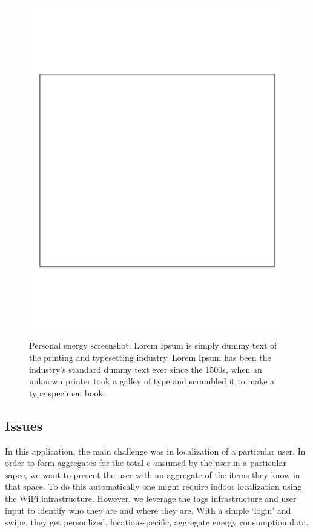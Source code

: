 \begin{figure}[htb!]
\begin{center}
\includegraphics[scale=0.39]{figs/blankbox}
\caption{Personal energy screenshot. Lorem Ipsum is simply dummy text of the printing and typesetting industry. Lorem Ipsum has 
been the industry's standard dummy text ever since the 1500s, when an unknown printer took a galley of 
type and scrambled it to make a type specimen book.  }
\label{fig:personalscanscreen}
\end{center}
\end{figure}

\subsection{Issues}
In this application, the main challenge was in localization of a particular user.  In order to form aggregates for the total c
onsumed by the user in a particular sapce, we want to present the user with an aggregate of the items they know in that space.  
To do this automatically one might require indoor localization using the WiFi infrastructure.  However, we leverage the tags infrastructure
and user input to identify who they are and where they are.  With a simple `login' and swipe, they get personlized,
location-specific, aggregate energy consumption data.

